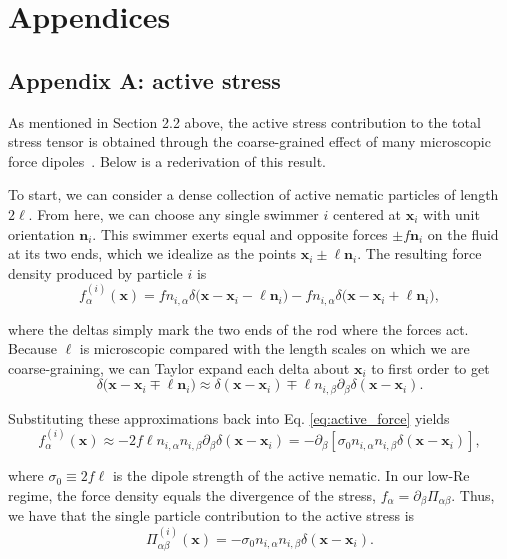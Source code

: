 \documentclass[11pt]{article}
\begin{document}
\pagebreak
\section*{Appendices}

\subsection*{Appendix A: active stress}

As mentioned in Section 2.2 above, the active stress contribution to the total stress tensor is obtained through the coarse-grained effect of many microscopic force dipoles~\cite{Bhattacharyya2024ActiveNematicsMechanobiology, simha2002hydrodynamic}. Below is a rederivation of this result.

To start, we can consider a dense collection of active nematic particles of length $2\ell$. From here, we can choose any single swimmer $i$ centered at $\mathbf{x}_i$ with unit orientation ${\mathbf{n}}_i$. This swimmer exerts equal and opposite forces $\pm f{\mathbf{n}}_i$ on the fluid at its two ends, which we idealize as the points $\mathbf{x}_i\pm \ell{\mathbf{n}}_i$. The resulting force density produced by particle $i$ is
\begin{equation}
f^{(i)}_\alpha(\mathbf{x})=f n_{i,\alpha}\delta\!\big(\mathbf{x}-\mathbf{x}_i - \ell \mathbf{n}_i\big)-f n_{i,\alpha}\delta\!\big(\mathbf{x}-\mathbf{x}_i+\ell{\mathbf{n}}_i\big),
\label{eq:active_force}
\end{equation}

where the deltas simply mark the two ends of the rod where the forces act. Because $\ell$ is microscopic compared with the length scales on which we are coarse-graining, we can Taylor expand each delta about $\mathbf{x}_i$ to first order to get
$$\delta\!\big(\mathbf{x}-\mathbf{x}_i\mp\ell{\mathbf{n}}_i\big)\approx\delta(\mathbf{x}-\mathbf{x}_i)\mp \ell n_{i,\beta}\partial_\beta \delta(\mathbf{x}-\mathbf{x}_i).$$

Substituting these approximations back into Eq. \eqref{eq:active_force} yields
\begin{equation}
f^{(i)}_\alpha(\mathbf{x})\approx-2f\ell n_{i,\alpha} n_{i,\beta}\partial_\beta \delta(\mathbf{x}-\mathbf{x}_i)=-\partial_\beta\!\left[\sigma_0 n_{i,\alpha} n_{i,\beta}\delta(\mathbf{x}-\mathbf{x}_i)\right],
\end{equation}

where $\sigma_0\equiv 2f\ell$ is the dipole strength of the active nematic. In our low-Re regime, the force density equals the divergence of the stress, $f_\alpha=\partial_\beta \Pi_{\alpha\beta}$. Thus, we have that the single particle contribution to the active stress is
$$\Pi^{(i)}_{\alpha\beta}(\mathbf{x})=-\sigma_0 n_{i,\alpha} n_{i,\beta}\delta(\mathbf{x}-\mathbf{x}_i).$$
\end{document}
